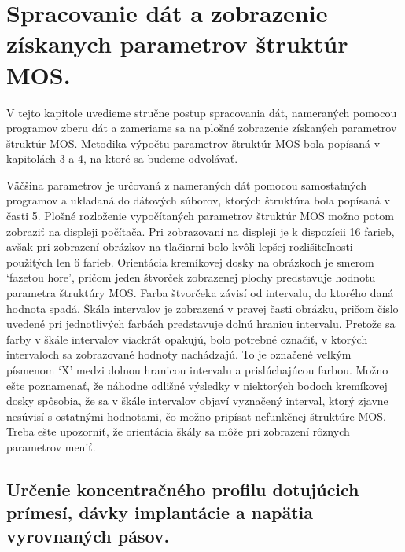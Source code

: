 
\chapter{Spracovanie dát a zobrazenie získanych parametrov štruktúr MOS.}%
\label{Chapter6} %

V tejto kapitole uvedieme stručne postup spracovania dát, nameraných
pomocou programov zberu dát a zameriame sa na plošné zobrazenie
získaných parametrov štruktúr MOS\@. Metodika výpočtu parametrov
štruktúr MOS bola popísaná v kapitolách 3 a 4, na ktoré sa budeme
odvolávať.

Väčšina parametrov je určovaná z nameraných dát pomocou samostatných
programov a ukladaná do dátových súborov, ktorých štruktúra bola
popísaná v časti 5. Plošné rozloženie vypočítaných parametrov štruktúr
MOS možno potom zobraziť na displeji počítača. Pri zobrazovaní na
displeji je k dispozícii 16 farieb, avšak pri zobrazení obrázkov na
tlačiarni bolo kvôli lepšej rozlišiteľnosti použitých len 6
farieb. Orientácia kremíkovej dosky na obrázkoch je smerom `fazetou
hore', pričom jeden štvorček zobrazenej plochy predstavuje hodnotu
parametra štruktúry MOS\@. Farba štvorčeka závisí od intervalu, do
ktorého daná hodnota spadá. Škála intervalov je zobrazená v pravej
časti obrázku, pričom číslo uvedené pri jednotlivých farbách
predstavuje dolnú hranicu intervalu. Pretože sa farby v škále
intervalov viackrát opakujú, bolo potrebné označiť, v ktorých
intervaloch sa zobrazované hodnoty nachádzajú. To je označené veľkým
písmenom `X' medzi dolnou hranicou intervalu a prislúchajúcou
farbou. Možno ešte poznamenať, že náhodne odlišné výsledky v
niektorých bodoch kremíkovej dosky spôsobia, že sa v škále intervalov
objaví vyznačený interval, ktorý zjavne nesúvisí s ostatnými
hodnotami, čo možno pripísat nefunkčnej štruktúre MOS\@. Treba ešte
upozorniť, že orientácia škály sa môže pri zobrazení rôznych
parametrov meniť.

\section{Určenie koncentračného profilu dotujúcich prímesí, dávky implantácie a napätia vyrovnaných pásov.}\label{sec:6.1}


